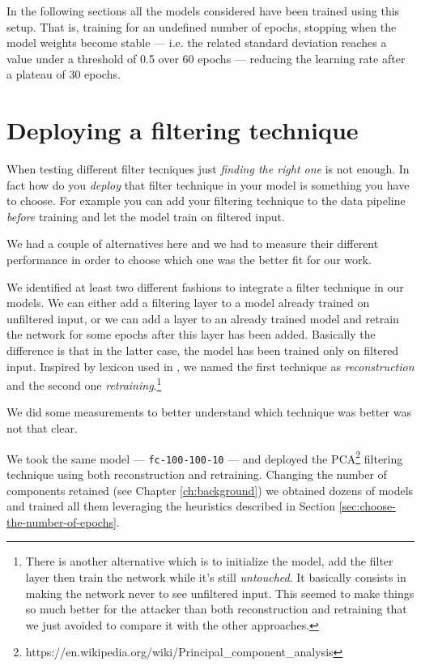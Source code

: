In the following sections all the models considered have been trained
using this setup. That is, training for an undefined number of
epochs, stopping when the model weights become stable --- i.e. the
related standard deviation reaches a value under a threshold of 0.5 over
60 epochs --- reducing the learning rate after a plateau of 30 epochs.

\section{Deploying a filtering technique}
\label{sec:deploying-a-filtering-technique}

When testing different filter tecniques just \emph{finding the right
  one} is not enough. In fact how do you \emph{deploy} that filter
technique in your model is something you have to choose. For example
you can add your filtering technique to the data pipeline \emph{before}
training and let the model train on filtered input.

We had a couple of alternatives here and we had to measure their
different performance in order to choose which one was the better fit
for our work.

We identified at least two different fashions to integrate a filter
technique in our models. We can either add a filtering layer to a model
already trained on unfiltered input, or we can add a layer to an
already trained model and retrain the network for some epochs after
this layer has been added. Basically the difference is that in the latter case, the model has
been trained only on filtered input.
Inspired by lexicon used in \cite{bhagoji2018enhancing}, we named the
first technique as \emph{reconstruction} and the second one
\emph{retraining}.\footnote{There is another alternative which is to
  initialize the model, add the filter layer then train the network
  while it's still \emph{untouched}. It basically consists in making
  the network never to see unfiltered input. This seemed to make things
  so much better for the attacker than both reconstruction and
  retraining that we just avoided to compare it with the other
  approaches.}

We did some measurements to better understand which technique was
better was not that clear.

We took the same model --- \texttt{fc-100-100-10} --- and deployed the
PCA\footnote{https://en.wikipedia.org/wiki/Principal\_component\_analysis}
filtering technique using both reconstruction and retraining. Changing
the number of components retained (see Chapter \ref{ch:background}) we
obtained dozens of models and trained all them leveraging the
heuristics described in Section
\ref{sec:choose-the-number-of-epochs}.

